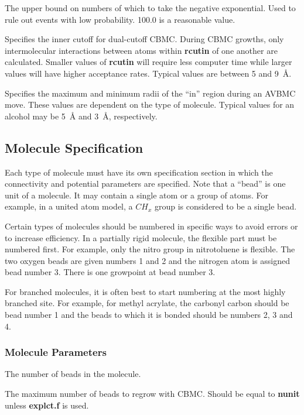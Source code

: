 \documentclass[12pt,letterpaper]{article}
\begin{document}
 The upper bound on numbers of which to take the negative exponential.  
Used to rule out events with low probability.
100.0 is a reasonable value.

 Specifies the inner cutoff for dual-cutoff CBMC.
During CBMC growths, only intermolecular interactions between atoms within {\textbf{rcutin}}
of one another are calculated.  
Smaller values of {\textbf{rcutin}} will require less computer time
while larger values will have higher acceptance rates. 
Typical values are between 5 and 9~{\AA}. 

 Specifies the maximum and minimum radii of the
``in'' region during an AVBMC move.  
These values are dependent on the type of molecule.
Typical values for an alcohol may be 5~{\AA} and 3~{\AA}, respectively.

\subsection{Molecule Specification}
Each type of molecule must have its own specification section in which the
connectivity and potential parameters are specified.  
Note that a ``bead'' is one unit of a molecule.  It may contain a single atom or a group of atoms.  
For example, in a united atom model, a $CH_x$ group is considered to be a single bead.

\noindent Certain types of molecules should be numbered in specific ways to avoid errors or to increase efficiency.
In a partially rigid molecule, the flexible part must be numbered first.  For example, only the nitro group in nitrotoluene is flexible. 
The two oxygen beads are given numbers 1 and 2 and the nitrogen atom is assigned bead number 3.  
There is one growpoint at bead number 3.

\noindent For branched molecules, it is often best to start numbering at the most highly branched site. 
For example, for methyl acrylate, the carbonyl carbon should be bead number 1 and the beads to which 
it is bonded should be numbers 2, 3 and 4.

\subsubsection{Molecule Parameters}

 The number of beads in the molecule.

 The maximum number of beads to regrow with CBMC.
Should be equal to {\textbf {nunit}} unless {\textbf {explct.f}} is used.
\end{document}
